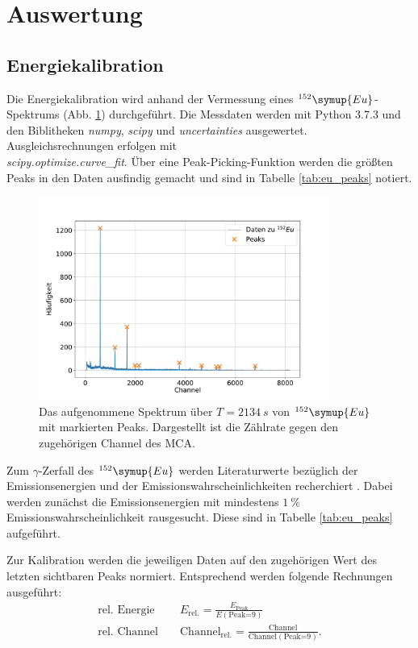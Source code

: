 \section{Auswertung}
\subsection{Energiekalibration}
Die Energiekalibration wird anhand der Vermessung eines $^{152}\symup{Eu}$-Spektrums (Abb. \ref{fig:eu_spectrum}) durchgeführt.
Die Messdaten werden mit Python 3.7.3 und den Biblitheken \textit{numpy}, \textit{scipy} und \textit{uncertainties} ausgewertet.
Ausgleichsrechnungen erfolgen mit \\\textit{scipy.optimize.curve\_fit}.
Über eine Peak-Picking-Funktion werden die größten Peaks in den Daten ausfindig gemacht und sind in Tabelle \ref{tab:eu_peaks} notiert.
\begin{figure}[h!]
  \centering
  \includegraphics[width=0.85\textwidth]{content/images/spektrum_europium.pdf}
  \caption{Das aufgenommene Spektrum über $T=\SI{2134}{s}$ von $^{152}\symup{Eu}$ mit markierten Peaks. Dargestellt ist die Zählrate gegen den zugehörigen Channel des MCA.}
  \label{fig:eu_spectrum}
\end{figure}
Zum $\gamma$-Zerfall des $^{152}\symup{Eu}$ werden Literaturwerte bezüglich der Emissionsenergien und der Emissionswahrscheinlichkeiten recherchiert \cite{nucleide}.
Dabei werden zunächst die Emissionsenergien mit mindestens $\SI{1}{\%}$ Emissionswahrscheinlichkeit rausgesucht.
Diese sind in Tabelle \ref{tab:eu_peaks} aufgeführt.

Zur Kalibration werden die jeweiligen Daten auf den zugehörigen Wert des letzten sichtbaren Peaks normiert.
Entsprechend werden folgende Rechnungen ausgeführt:
\begin{align*}
	\text{rel. Energie } && E_{\text{rel.}} 				= \frac{ E_{\text{Peak}} }{ E (\text{Peak=9}) } \\
	\text{rel. Channel } && \text{Channel}_{\text{rel.}} 	= \frac{ \text{Channel} }{ \text{Channel} (\text{Peak=9}) }. \\
\end{align*}
